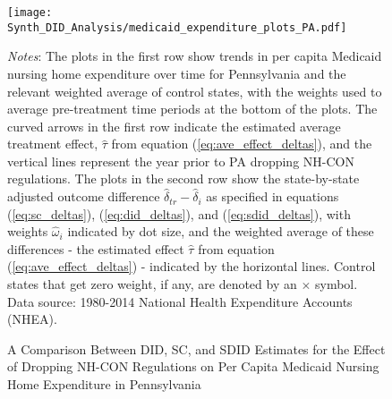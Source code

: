 \documentclass[../Main.tex]{subfiles}
\begin{document}
\newpage
\begin{figure}[t] 
	\begin{center}
	\caption{\label{fig:med_exp_plots_pa} \centering A Comparison Between DID, SC, and SDID Estimates for the Effect of Dropping NH-CON Regulations on Per Capita Medicaid Nursing Home Expenditure in Pennsylvania}
    \texttt{[image: Synth\_DID\_Analysis/medicaid\_expenditure\_plots\_PA.pdf]}
    \end{center}
    \footnotesize
		\textit{Notes}: The plots in the first row show trends in per capita Medicaid nursing home expenditure over time for Pennsylvania and the relevant weighted average of control states, with the weights used to average pre-treatment time periods at the bottom of the plots. The curved arrows in the first row indicate the estimated average treatment effect, $\hat{\tau}$ from equation (\ref{eq:ave_effect_deltas}), and the vertical lines represent the year prior to PA dropping NH-CON regulations. The plots in the second row show the state-by-state adjusted outcome difference $\hat{\delta}_{tr}-\hat{\delta}_i$ as specified in equations (\ref{eq:sc_deltas}), (\ref{eq:did_deltas}), and (\ref{eq:sdid_deltas}), with weights $\hat{\omega}_i$ indicated by dot size, and the weighted average of these differences - the estimated effect $\hat{\tau}$ from equation (\ref{eq:ave_effect_deltas}) - indicated by the horizontal lines. Control states that get zero weight, if any, are denoted by an $\times$ symbol. Data source: 1980-2014 National Health Expenditure Accounts (NHEA).
\end{figure}
\clearpage
\end{document}
